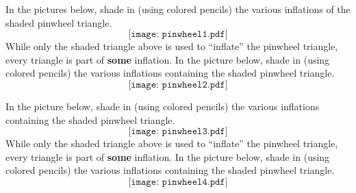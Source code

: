 \documentclass[noauthor,nooutcomes,handout,hints,12pt]{ximera}
\begin{document}
\begin{question}
In the pictures below, shade in (using colored pencils) the various
inflations of the shaded pinwheel triangle.
\[
\texttt{[image: pinwheel1.pdf]}
\]
While only the shaded triangle above is used to ``inflate'' the
pinwheel triangle, every triangle is part of \textbf{some}
inflation. In the picture below, shade in (using colored pencils) the
various inflations containing the shaded pinwheel triangle.
\[
\texttt{[image: pinwheel2.pdf]}
\]
\end{question}


\mynewpage

\begin{question}
In the picture below, shade in (using colored pencils) the
various inflations containing the shaded pinwheel triangle.
\[
\texttt{[image: pinwheel3.pdf]}
\]
While only the shaded triangle above is used to ``inflate'' the
pinwheel triangle, every triangle is part of \textbf{some}
inflation. In the picture below, shade in (using colored pencils) the
various inflations containing the shaded pinwheel triangle.
\[
\texttt{[image: pinwheel4.pdf]}
\]
\end{question}








\end{document}
